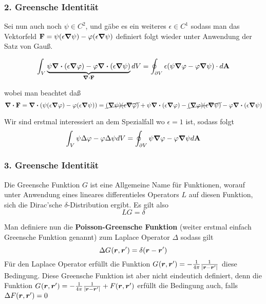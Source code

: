 \subsubsection{2. Greensche Identität}%
\label{ssub:green-id-2}
Sei nun auch noch $\psi\in C^2$, und gäbe es ein weiteres $\epsilon\in C^1$
sodass man das Vektorfeld 
$\vb F=\psi(\epsilon\grad\psi) - \varphi(\epsilon\grad\psi)$ 
definiert folgt wieder
unter Anwendung der Satz von Gauß.

\begin{equation}
  \int_V \underbrace{\psi\div(\epsilon\grad\varphi) - \varphi\div(\epsilon\grad\psi)}_{\div \vb F} dV
  = \oint_{\partial V} \epsilon (\psi \grad \varphi - \varphi \grad \psi) 
  \cdot d\vb A
\end{equation}

wobei man beachtet daß
\begin{equation*}
  \div \vb F = \div (\psi (\epsilon\grad\varphi) - \varphi(\epsilon\grad\psi))
  = \cancel{(\grad\psi)(\epsilon\grad\varphi)} 
  + \psi\div(\epsilon\grad\varphi)
  - \cancel{(\grad\varphi)(\epsilon\grad\psi)}
  - \varphi\div(\epsilon\grad\psi)
\end{equation*}

Wir sind erstmal interessiert an dem Spezialfall wo $\epsilon=1$ ist, sodass
folgt
\begin{equation}
  \int_V \psi\Delta\varphi - \varphi\Delta\psi dV= 
  \oint_{\partial V} \psi\grad\varphi - \varphi\grad\psi d\vb A
\end{equation}

\subsubsection{3. Greensche Identität}%
\label{ssub:green-id-3}

Die Greensche Funktion $G$ ist eine Allgemeine Name für Funktionen, worauf unter Anwendung eines lineares differentieles Operators $L$ auf diesen Funktion, sich die Dirac'sche $\delta$-Distribution ergibt. Es gilt also
\begin{equation}
  LG = \delta 
\end{equation}

Man definiere nun die \textbf{Poisson-Greensche Funktion} (weiter erstmal einfach Greensche Funktion genannt) zum Laplace Operator $\Delta$ sodass gilt
\begin{equation}
  \Delta G_{}(\vb*r,\vb*r')= \delta(\vb*r - \vb*r')
\end{equation}
Für den Laplace Operator erfüllt die Funktion 
$G_{}(\vb*r,\vb*r')=-\frac{1}{4\pi}\frac{1}{\abs{\vb*r-\vb*r'}}$ 
diese Bedingung. Diese 
Greensche Funktion ist aber nicht eindeutich definiert, denn die Funktion 
$G_{}(\vb*r,\vb*r')
=-\frac{1}{4\pi}\frac{1}{\abs{\vb*r-\vb*r'}} + F(\vb*r,\vb*r')$ erfüllt die
Bedingung auch, falls $\Delta F(\vb*r, \vb*r')=0$

